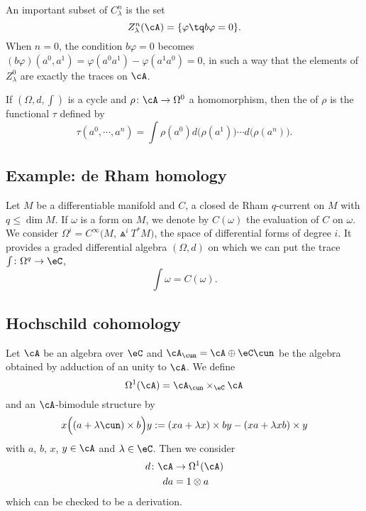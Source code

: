 An important subset of $C^n_{\lambda}$ is the set
\begin{equation}
	Z^n_{\lambda}(\cA)=\{ \varphi\tq b\varphi=0 \}.
\end{equation}
When $n=0$, the condition $b\varphi=0$ becomes $(b\varphi)(a^0,a^1)=\varphi(a^0a^1)-\varphi(a^1a^0)=0$, in such a way that the elements of $Z^0_{\lambda}$ are exactly the traces on $\cA$.

If $(\Omega,d,\int)$ is a cycle and $\rho\colon \cA\to \Omega^0$ a homomorphism, then the  of $\rho$ is the functional $\tau$ defined by
\begin{equation}
	\tau(a^0,\cdots,a^{n})=\int \rho(a^0)d\big( \rho(a^1) \big)\cdots d\big( \rho(a^{n}) \big).
\end{equation}


\subsection{Example: de Rham homology}

Let $M$ be a differentiable manifold and $C$, a closed de Rham $q$-current on $M$ with $q\leq\dim M$. If $\omega$ is a form on $M$, we denote by $C(\omega)$ the evaluation of $C$ on $\omega$. We consider $\Omega^{i}= C^{\infty}\big( M,\Wedge^i T^*M \big)$, the space of differential forms of degree $i$. It provides a graded differential algebra $(\Omega,d)$ on which we can put the trace $\int\colon \Omega^q\to \eC$,
\[
	\int \omega=C(\omega).
\]

\subsection{Hochschild cohomology}

Let $\cA$ be an algebra over $\eC$ and $\cA_{\cun}=\cA\oplus\eC\cun$ be the algebra obtained by adduction of an unity to $\cA$. We define
\[
	\Omega^1(\cA)=\cA_{\cun}\times_{\eC}\cA
\]
and an $\cA$-bimodule structure by
\[
	x\Big( (a+\lambda\cun)\times b \Big)y:=(xa+\lambda x)\times by-(xa+\lambda xb)\times y
\]
with $a$, $b$, $x$, $y\in\cA$ and $\lambda\in\eC$. Then we consider
\begin{equation}
	\begin{aligned}
		d\colon \cA & \to \Omega^1(\cA) \\
		da          & = 1\otimes a
	\end{aligned}
\end{equation}
which can be checked to be a derivation.

